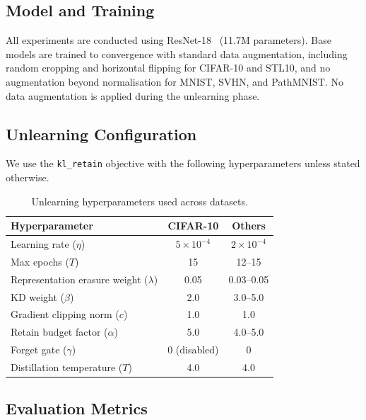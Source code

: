 \documentclass[10pt,twocolumn]{article}
\newcommand{\klr}{\texttt{kl\_retain}}
\begin{document}
\subsection{Model and Training}

All experiments are conducted using ResNet-18~\cite{he2016resnet} (11.7M parameters).
Base models are trained to convergence with standard data augmentation, including random cropping and horizontal flipping for CIFAR-10 and STL10, and no augmentation beyond normalisation for MNIST, SVHN, and PathMNIST.
No data augmentation is applied during the unlearning phase.

\subsection{Unlearning Configuration}

We use the \klr{} objective with the following hyperparameters unless stated otherwise.

\begin{table}[H]
\centering
\small
\begin{tabular}{lcc}
\toprule
\textbf{Hyperparameter} & \textbf{CIFAR-10} & \textbf{Others} \\
\midrule
Learning rate ($\eta$) & $5 \times 10^{-4}$ & $2 \times 10^{-4}$ \\
Max epochs ($T$) & 15 & 12--15 \\
Representation erasure weight ($\lambda$) & 0.05 & 0.03--0.05 \\
KD weight ($\beta$) & 2.0 & 3.0--5.0 \\
Gradient clipping norm ($c$) & 1.0 & 1.0 \\
Retain budget factor ($\alpha$) & 5.0 & 4.0--5.0 \\
Forget gate ($\gamma$) & 0 (disabled) & 0 \\
Distillation temperature ($T$) & 4.0 & 4.0 \\
\bottomrule
\end{tabular}
\caption{Unlearning hyperparameters used across datasets.}
\end{table}

\subsection{Evaluation Metrics}
\end{document}
